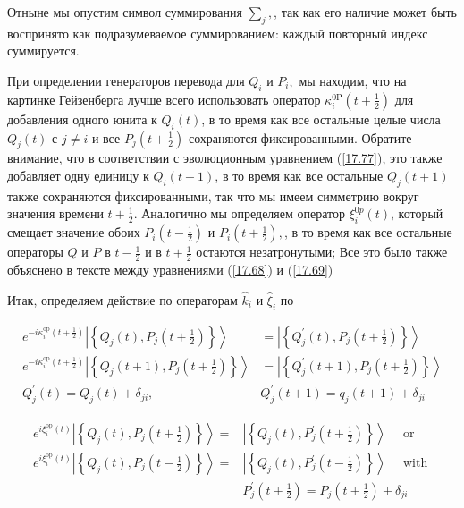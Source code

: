 \documentclass[main.tex]{subfiles}
\begin{document}
Отныне мы опустим символ суммирования $\sum_{j},$, так как его наличие может быть воспринято как подразумеваемое суммированием: каждый повторный индекс суммируется.

При определении генераторов перевода для $Q_{i}$ и $P_{i},$ мы находим, что на картинке Гейзенберга лучше всего использовать оператор $\kappa_{i}^{0 \mathrm{P}}\left(t+\frac{1}{2}\right)$ для добавления одного юнита к $Q_{i}(t)$, в то время как все остальные целые числа $Q_{j}(t)$ с $j \neq i$ и все $P_{j}\left(t+\frac{1}{2}\right)$ сохраняются фиксированными. Обратите внимание, что в соответствии с эволюционным уравнением (\ref{17.77}), это также добавляет одну единицу к $Q_{i}(t+1)$, в то время как все остальные $Q_{j}(t+1)$ также сохраняются фиксированными, так что мы имеем симметрию вокруг значения времени $t+\frac{1}{2} .$ Аналогично мы определяем оператор $\xi_{i}^{0 p}(t)$, который смещает значение обоих $P_{i}\left(t-\frac{1}{2}\right)$ и $P_{i}\left(t+\frac{1}{2}\right),$, в то время как все остальные операторы $Q$ и $P$ в $t-\frac{1}{2}$ и в $t+\frac{1}{2}$ остаются незатронутыми; Все это было также объяснено в тексте между уравнениями (\ref{17.68}) и (\ref{17.69})

Итак, определяем действие по операторам $\hat k_i$ и $\hat\xi_i$ по

\begin{equation}\label{17.80}
	\begin{aligned} e^{-i \kappa_{i}^{\mathrm{op}}\left(t+\frac{1}{2}\right)}\left|\left\{Q_{j}(t), P_{j}\left(t+\frac{1}{2}\right)\right\}\right\rangle &=\left|\left\{Q_{j}^{\prime}(t), P_{j}\left(t+\frac{1}{2}\right)\right\}\right\rangle \\ e^{-i \kappa_{i}^{\mathrm{op}}\left(t+\frac{1}{2}\right)}\left|\left\{Q_{j}(t+1), P_{j}\left(t+\frac{1}{2}\right)\right\}\right\rangle &=\left|\left\{Q_{j}^{\prime}(t+1), P_{j}\left(t+\frac{1}{2}\right)\right\}\right\rangle \\ Q_{j}^{\prime}(t)=Q_{j}(t)+\delta_{j i}, & Q_{j}^{\prime}(t+1)=q_{j}(t+1)+\delta_{j i} \end{aligned}
\end{equation}



\begin{equation}\label{17.81}
	\begin{aligned} e^{i \xi_{i}^{\mathrm{op}}(t)}\left|\left\{Q_{j}(t), P_{j}\left(t+\frac{1}{2}\right)\right\}\right\rangle=&\left|\left\{Q_{j}(t), P_{j}^{\prime}\left(t+\frac{1}{2}\right)\right\}\right\rangle \quad \text { or } \\ e^{i \xi_{i}^{\mathrm{op}}(t)}\left|\left\{Q_{j}(t), P_{j}\left(t-\frac{1}{2}\right)\right\}\right\rangle=&\left|\left\{Q_{j}(t), P_{j}^{\prime}\left(t-\frac{1}{2}\right)\right\}\right\rangle \quad \text { with } \\ & P_{j}^{\prime}\left(t \pm \frac{1}{2}\right)=P_{j}\left(t \pm \frac{1}{2}\right)+\delta_{j i} \end{aligned}
\end{equation}
\end{document}
